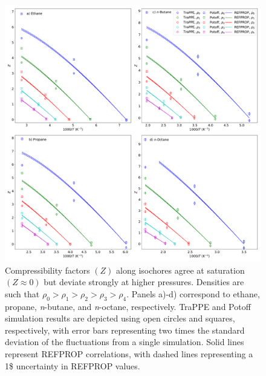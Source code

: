 \documentclass[journal=jctc,manuscript=article]{achemso}
\begin{document}
\begin{figure}[htb!]
	\centering
	\includegraphics[width=6.4in]{IC_normal_alkanes_TraPPE_Potoff}
	\caption{Compressibility factors $(Z)$ along isochores agree at saturation $(Z \approx 0)$ but deviate strongly at higher pressures. Densities are such that $\rho_0 > \rho_1 > \rho_2 > \rho_3 > \rho_4$.  Panels a)-d) correspond to ethane, propane, \textit{n}-butane, and \textit{n}-octane, respectively. TraPPE and Potoff simulation results are depicted using open circles and squares, respectively, with error bars representing two times the standard deviation of the fluctuations from a single simulation. Solid lines represent REFPROP correlations, with dashed lines representing a 1\$ uncertainty in REFPROP values.}
	\label{fig:IC_normal_alkanes}
\end{figure}
\end{document}
